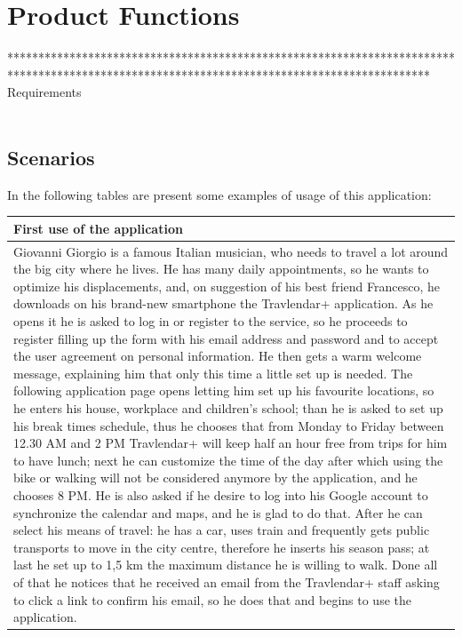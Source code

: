 \section{Product Functions}
******************************************************************************************************************************************** \\
Requirements
\\
\\
\subsection*{Scenarios}
In the following tables are present some examples of usage of this application:
%
\begin{center}
\def\arraystretch{1.5}
  \begin{tabular}{ | p{} | }
    \hline
    First use of the application \\ \hline
    Giovanni Giorgio is a famous Italian musician, who needs to travel a lot around the big city where he lives. He has many daily appointments, so he wants to optimize his displacements, and, on suggestion of his best friend Francesco, he downloads on his brand-new smartphone the Travlendar+ application. As he opens it he is asked to log in or register to the service, so he proceeds to register filling up the form with his email address and password and to accept the user agreement on personal information. He then gets a warm welcome message, explaining him that only this time a little set up is needed. The following application page opens letting him set up his favourite locations, so he enters his house, workplace and children’s school; than he is asked to set up his break times schedule, thus he chooses that from Monday to Friday between 12.30 AM and 2 PM Travlendar+ will keep half an hour free from trips for him to have lunch; next he can customize the time of the day after which using the bike or walking will not be considered anymore by the application, and he chooses 8 PM. He is also asked if he desire to log into his Google account to synchronize the calendar and maps, and he is glad to do that. After he can select his means of travel: he has a car, uses train and frequently gets public transports to move in the city centre, therefore he inserts his season pass; at last he set up to 1,5 km the maximum distance he is willing to walk. Done all of that he notices that he received an email from the Travlendar+ staff asking to click a link to confirm his email, so he does that and begins to use the application. \\ \hline
  \end{tabular}
\end{center}
